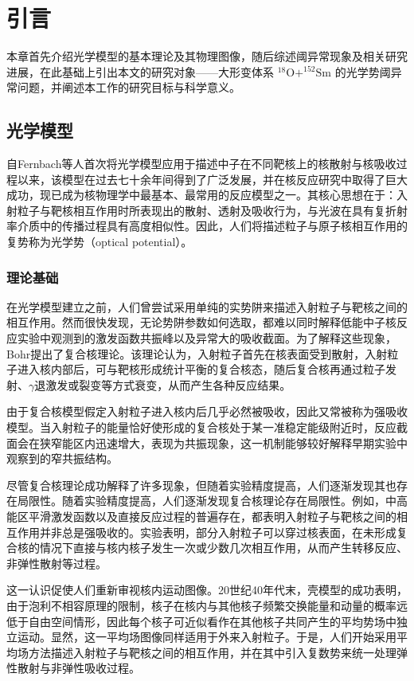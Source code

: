 \chapter{引言}
本章首先介绍光学模型的基本理论及其物理图像，随后综述阈异常现象及相关研究进展，在此基础上引出本文的研究对象——大形变体系 $^{18}\mathrm{O}+^{152}\mathrm{Sm}$ 的光学势阈异常问题，并阐述本工作的研究目标与科学意义。
\section{光学模型}

自Fernbach等人\cite{fernbach1949scattering}首次将光学模型应用于描述中子在不同靶核上的核散射与核吸收过程以来，该模型在过去七十余年间得到了广泛发展，并在核反应研究中取得了巨大成功，现已成为核物理学中最基本、最常用的反应模型之一。其核心思想在于：入射粒子与靶核相互作用时所表现出的散射、透射及吸收行为，与光波在具有复折射率介质中的传播过程具有高度相似性\cite{feshbach1958optical,hodgson1971nuclear}。因此，人们将描述粒子与原子核相互作用的复势称为光学势（optical potential）。

\subsection{理论基础}

在光学模型建立之前，人们曾尝试采用单纯的实势阱来描述入射粒子与靶核之间的相互作用。然而很快发现，无论势阱参数如何选取，都难以同时解释低能中子核反应实验中观测到的激发函数共振峰以及异常大的吸收截面。为了解释这些现象，Bohr提出了复合核理论。该理论认为，入射粒子首先在核表面受到散射，入射粒子进入核内部后，可与靶核形成统计平衡的复合核态，随后复合核再通过粒子发射、$\gamma$退激发或裂变等方式衰变，从而产生各种反应结果。

由于复合核模型假定入射粒子进入核内后几乎必然被吸收，因此又常被称为强吸收模型。当入射粒子的能量恰好使形成的复合核处于某一准稳定能级附近时，反应截面会在狭窄能区内迅速增大，表现为共振现象，这一机制能够较好解释早期实验中观察到的窄共振结构。

尽管复合核理论成功解释了许多现象，但随着实验精度提高，人们逐渐发现其也存在局限性。随着实验精度提高，人们逐渐发现复合核理论存在局限性。例如，中高能区平滑激发函数以及直接反应过程的普遍存在，都表明入射粒子与靶核之间的相互作用并非总是强吸收的。实验表明，部分入射粒子可以穿过核表面，在未形成复合核的情况下直接与核内核子发生一次或少数几次相互作用，从而产生转移反应、非弹性散射等过程。

这一认识促使人们重新审视核内运动图像。20世纪40年代末，壳模型的成功表明，由于泡利不相容原理的限制，核子在核内与其他核子频繁交换能量和动量的概率远低于自由空间情形，因此每个核子可近似看作在其他核子共同产生的平均势场中独立运动。显然，这一平均场图像同样适用于外来入射粒子。于是，人们开始采用平均场方法描述入射粒子与靶核之间的相互作用，并在其中引入复数势来统一处理弹性散射与非弹性吸收过程。

